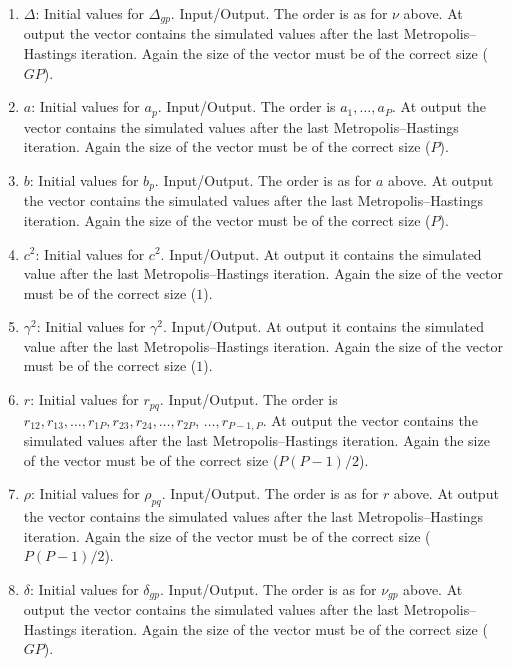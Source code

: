 \documentclass[11pt]{article}
\begin{document}
\begin{enumerate}
\item $\Delta$: Initial values for $\Delta_{gp}$. Input/Output. The order is as for $\nu$ above.
At output
the vector contains the simulated values after the last Metropolis--Hastings iteration.
Again the size of the vector must be of the correct size ($GP$).

\item $a$: Initial values for $a_{p}$. Input/Output. The order is $a_1,\ldots,a_P$.
At output
the vector contains the simulated values after the last Metropolis--Hastings iteration.
Again the size of the vector must be of the correct size ($P$).

\item $b$: Initial values for $b_{p}$. Input/Output. The order is as for $a$ above.
At output
the vector contains the simulated values after the last Metropolis--Hastings iteration.
Again the size of the vector must be of the correct size ($P$).

\item $c^2$: Initial values for $c^2$. Input/Output.
At output it contains the simulated value after the last Metropolis--Hastings iteration.
Again the size of the vector must be of the correct size ($1$).

\item $\gamma^2$: Initial values for $\gamma^2$. Input/Output.
At output it contains the simulated value after the last Metropolis--Hastings iteration.
Again the size of the vector must be of the correct size ($1$).

\item $r$: Initial values for $r_{pq}$. Input/Output. The order is $r_{12},r_{13},\ldots,
r_{1P},r_{23},r_{24},\ldots,r_{2P}$, $\ldots,r_{P-1,P}$.
At output
the vector contains the simulated values after the last Metropolis--Hastings iteration.
Again the size of the vector must be of the correct size ($P(P-1)/2$).

\item $\rho$: Initial values for $\rho_{pq}$. Input/Output. The order is as for $r$ above.
At output
the vector contains the simulated values after the last Metropolis--Hastings iteration.
Again the size of the vector must be of the correct size ($P(P-1)/2$).

\item $\delta$: Initial values for $\delta_{gp}$. Input/Output. The order is as for 
$\nu_{gp}$ above. At output
the vector contains the simulated values after the last Metropolis--Hastings iteration.
Again the size of the vector must be of the correct size ($GP$).


\end{enumerate}
\end{document}
